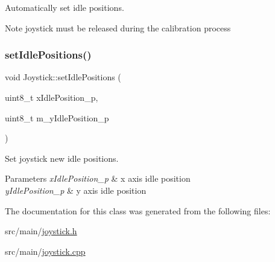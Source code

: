 Automatically set idle positions. 

\begin{DoxyNote}{Note}
joystick must be released during the calibration process 
\end{DoxyNote}
\mbox{\label{class_joystick_a70f101e3395a939fb757522b14d830c9}} 
\subsubsection{\texorpdfstring{set\+Idle\+Positions()}{setIdlePositions()}}
{\footnotesize\ttfamily void Joystick\+::set\+Idle\+Positions (\begin{DoxyParamCaption}\item[{uint8\+\_\+t}]{x\+Idle\+Position\+\_\+p,  }\item[{uint8\+\_\+t}]{m\+\_\+y\+Idle\+Position\+\_\+p }\end{DoxyParamCaption})}



Set joystick new idle positions. 


\begin{DoxyParams}{Parameters}
{\em x\+Idle\+Position\+\_\+p} & x axis idle position \\
\hline
{\em y\+Idle\+Position\+\_\+p} & y axis idle position \\
\hline
\end{DoxyParams}


The documentation for this class was generated from the following files\+:\begin{DoxyCompactItemize}
\item 
src/main/\hyperlink{joystick_8h}{joystick.\+h}\item 
src/main/\hyperlink{joystick_8cpp}{joystick.\+cpp}\end{DoxyCompactItemize}
